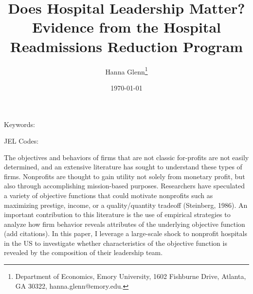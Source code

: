 \documentclass[12pt]{article}
\begin{document}
	
	
	
	
	\linespread{1.2}\title{\vspace{-0.5in} Does Hospital Leadership Matter?\\ \large Evidence from the Hospital Readmissions Reduction Program} 
	
	\date{\today}
	
	\author{\vspace{10mm}Hanna Glenn\footnote{Department of Economics, Emory University, 1602 Fishburne Drive, Atlanta, GA 30322, hanna.glenn@emory.edu.} }
	
	\maketitle
	
	\vspace{-0.2in}
	
	\singlespacing\maketitle
	
	\begin{abstract}
		{\small
			
			
		} 
	\end{abstract}
	
	
	
	
	\vspace{0.1in}
	
	\noindent Keywords: 
	
	\noindent JEL Codes: 
	
	\onehalfspacing
	
	\newpage

  The objectives and behaviors of firms that are not classic for-profits are not easily determined, and an extensive literature has sought to understand these types of firms. Nonprofits are thought to gain utility not solely from monetary profit, but also through accomplishing mission-based purposes. Researchers have speculated a variety of objective functions that could motivate nonprofits such as maximizing prestige, income, or a quality/quantity tradeoff (Steinberg, 1986). An important contribution to this literature is the use of empirical strategies to analyze how firm behavior reveals attributes of the underlying objective function (add citations). In this paper, I leverage a large-scale shock to nonprofit hospitals in the US to investigate whether characteristics of the objective function is revealed by the composition of their leadership team.
  
\end{document}

